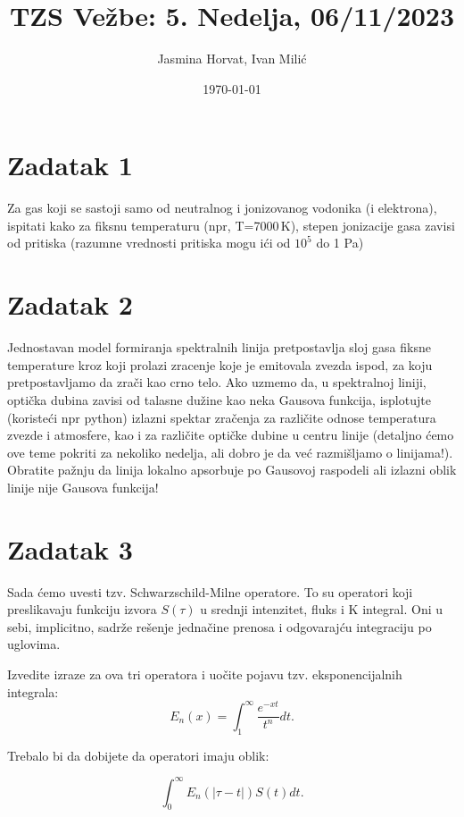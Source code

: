 \documentclass[12pt]{article}
\title{TZS Ve\v{z}be: 5. Nedelja, 06/11/2023}
\author{Jasmina Horvat, Ivan Mili\'{c}}
\date{\today}
\begin{document}
\maketitle

\section{Zadatak 1}
Za gas koji se sastoji samo od neutralnog i jonizovanog vodonika (i elektrona), ispitati kako za fiksnu temperaturu (npr, T=7000\,K), stepen jonizacije gasa zavisi od pritiska (razumne vrednosti pritiska mogu i\'{c}i od $10^5$ do 1 Pa)

\section{Zadatak 2}

Jednostavan model formiranja spektralnih linija pretpostavlja sloj gasa fiksne temperature kroz koji prolazi zracenje koje je emitovala zvezda ispod, za koju pretpostavljamo da zra\v{c}i kao crno telo. Ako uzmemo da, u spektralnoj liniji, opti\v{c}ka dubina zavisi od talasne du\v{z}ine kao neka Gausova funkcija, isplotujte (koristeći npr python) izlazni spektar zračenja za različite odnose temperatura zvezde i atmosfere, kao i za različite optičke dubine u centru linije (detaljno ćemo ove teme pokriti za nekoliko nedelja, ali dobro je da već razmišljamo o linijama!). Obratite pa\v{z}nju da linija lokalno apsorbuje po Gausovoj raspodeli ali izlazni oblik linije nije Gausova funkcija!

\section{Zadatak 3}
Sada \'{c}emo uvesti tzv. Schwarzschild-Milne operatore. To su operatori koji preslikavaju funkciju izvora $S(\tau)$ u srednji intenzitet, fluks i K integral. Oni u sebi, implicitno, sadr\v{z}e re\v{s}enje jedna\v{c}ine prenosa i odgovaraj\'{c}u integraciju po uglovima. 

Izvedite izraze za ova tri operatora i uo\v{c}ite pojavu tzv. eksponencijalnih integrala:
\begin{equation}
E_n(x) = \int_1^{\infty} \frac{e^{-xt}}{t^n} dt.
\end{equation}

Trebalo bi da dobijete da operatori imaju oblik: 

\begin{equation}
\int_0^{\infty} E_n(|\tau-t|) S(t) dt.
\end{equation}
\end{document}
